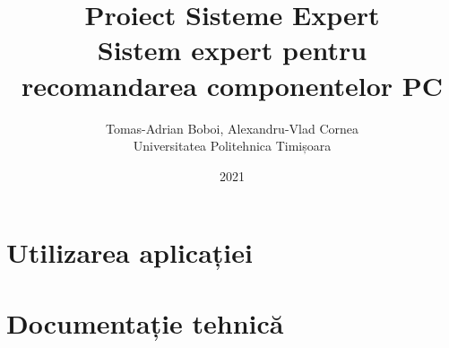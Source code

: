 \documentclass[12pt]{article}
\author{Tomas-Adrian Boboi, Alexandru-Vlad Cornea\\ Universitatea Politehnica Timișoara}
\date{2021}
\title{Proiect Sisteme Expert\\ \Large{Sistem expert pentru recomandarea componentelor PC}}
\begin{document}
    
    \maketitle
    \pagebreak

    \tableofcontents
    \pagebreak

    \section{Utilizarea aplicației}
    \lipsum[1-3]
    \pagebreak

    \section{Documentație tehnică}
    \lipsum[1-10]
\end{document}
